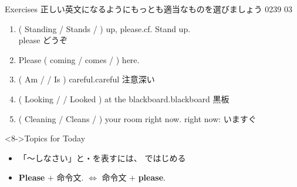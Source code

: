 \documentclass[aspectratio=169,xcolor={dvipsnames,table}]{beamer}
\begin{document}
\begin{frame}[plain]{Exercises}
  正しい英文になるようにもっとも適当なものを選びましょう%
  \hfill{\tiny 0239}\,{\scriptsize {}}\,{\tiny 03}

  \begin{enumerate}
    \item ( Standing / Stands /  ) up, please.\hfill{\scriptsize cf. Stand up.}\\
          \hfill{\scriptsize please  どうぞ}
    \item Please ( coming / comes /  ) here.\hfill{}
    \item ( Am /  / Is ) careful.\hfill{}{\scriptsize careful  注意深い}
    \item ( Looking /  / Looked ) at the blackboard.\hfill{\scriptsize blackboard  黒板}
    \item ( Cleaning / Cleans /  ) your room right now. \hfill{\scriptsize right now: いますぐ}
  \end{enumerate}

  \begin{block}<8->{Topics for Today}
    \begin{itemize}[square]\small
      \item<8-> 「～しなさい」と・を表すには、\,\,ではじめる
      \item<9-> \textbf{Please} $+$ 命令文. $\Longleftrightarrow$ 命令文 $+$ \textbf{ please}.\\
            \hfill{\scriptsize {}}
    \end{itemize}
  \end{block}


\end{frame}
\end{document}
